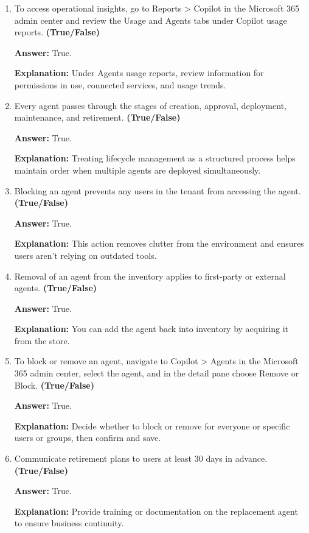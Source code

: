 \documentclass[10pt]{article}
\begin{document}
\begin{enumerate}[leftmargin=*]
\item To access operational insights, go to Reports > Copilot in the Microsoft 365 admin center and review the Usage and Agents tabs under Copilot usage reports. \textbf{(True/False)}

\textbf{Answer:} True.

\textbf{Explanation:} Under Agents usage reports, review information for permissions in use, connected services, and usage trends.

\item Every agent passes through the stages of creation, approval, deployment, maintenance, and retirement. \textbf{(True/False)}

\textbf{Answer:} True.

\textbf{Explanation:} Treating lifecycle management as a structured process helps maintain order when multiple agents are deployed simultaneously.

\item Blocking an agent prevents any users in the tenant from accessing the agent. \textbf{(True/False)}

\textbf{Answer:} True.

\textbf{Explanation:} This action removes clutter from the environment and ensures users aren’t relying on outdated tools.

\item Removal of an agent from the inventory applies to first-party or external agents. \textbf{(True/False)}

\textbf{Answer:} True.

\textbf{Explanation:} You can add the agent back into inventory by acquiring it from the store.

\item To block or remove an agent, navigate to Copilot > Agents in the Microsoft 365 admin center, select the agent, and in the detail pane choose Remove or Block. \textbf{(True/False)}

\textbf{Answer:} True.

\textbf{Explanation:} Decide whether to block or remove for everyone or specific users or groups, then confirm and save.

\item Communicate retirement plans to users at least 30 days in advance. \textbf{(True/False)}

\textbf{Answer:} True.

\textbf{Explanation:} Provide training or documentation on the replacement agent to ensure business continuity.


\end{enumerate}
\end{document}
